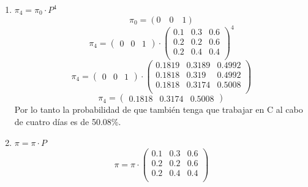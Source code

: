 \documentclass{templateNote}
\begin{document}
\begin{enumerate}
    \begin{enumerate}[label=\alph*)]
        \item $\pi_4 = \pi_0 \cdot P^4$
        \begin{equation*}
            \pi_0 = (0 \quad 0 \quad 1)
        \end{equation*}
        \begin{equation*}
            \pi_4 = 
            \begin{pmatrix}
                0 & 0 & 1
            \end{pmatrix}
            \cdot
            \begin{pmatrix}
                0.1 & 0.3 & 0.6\\
                0.2 & 0.2 & 0.6\\
                0.2 & 0.4 & 0.4\\
            \end{pmatrix}^4
        \end{equation*}
        \begin{equation*}
            \pi_4 = 
            \begin{pmatrix}
                0 & 0 & 1
            \end{pmatrix}
            \cdot
            \begin{pmatrix}
                0.1819 & 0.3189 & 0.4992\\
                0.1818 & 0.319 & 0.4992\\
                0.1818 & 0.3174 & 0.5008\\
            \end{pmatrix}
        \end{equation*}
        \begin{equation*}
            \pi_4 = 
            \begin{pmatrix}
                0.1818 & 0.3174 & 0.5008
            \end{pmatrix}
        \end{equation*}
        Por lo tanto la probabilidad de que también tenga que trabajar en C al cabo de cuatro días es de 50.08\%.
        \item $\pi = \pi \cdot P$
        \begin{equation*}
            \pi = \pi 
            \cdot 
            \begin{pmatrix}
                0.1 & 0.3 & 0.6\\
                0.2 & 0.2 & 0.6\\
                0.2 & 0.4 & 0.4\\

\end{pmatrix}
\end{equation*}
\end{enumerate}
\end{enumerate}
\end{document}
